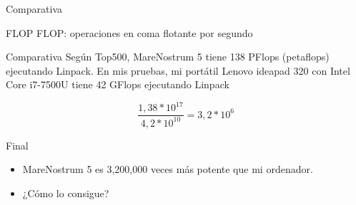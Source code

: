 \documentclass[bigger]{beamer}
\begin{document}
\begin{frame}[label={sec:orgfcc06f1}]{Comparativa}
\begin{block}{FLOP}
FLOP: operaciones en coma flotante por segundo
\end{block}

\begin{block}{Comparativa}
Según Top500, MareNostrum 5 tiene 138 PFlops (petaflops) ejecutando Linpack.
En mis pruebas, mi portátil Lenovo ideapad 320 con Intel Core i7-7500U tiene 42 GFlops ejecutando Linpack

\begin{equation}
\frac{1,38 * 10^{17}}{4,2 * 10^{10}} = 3,2 * 10^6
\end{equation}
\end{block}
\end{frame}

\begin{frame}[label={sec:org1efee77}]{Final}
\begin{itemize}
\item MareNostrum 5 es 3,200,000 veces más potente que mi ordenador.
\item ¿Cómo lo consigue?
\end{itemize}
\end{frame}
\end{document}
